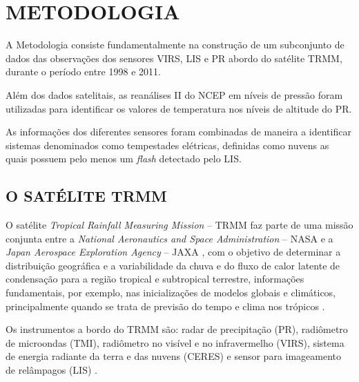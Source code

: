 \chapter{METODOLOGIA}
\label{metodologia}

A Metodologia consiste fundamentalmente na construção de um subconjunto de dados das observações dos sensores VIRS, LIS e PR abordo do satélite TRMM, durante o período entre 1998 e 2011. 

Além dos dados satelitais, as reanálises II do NCEP  em níveis de pressão foram utilizadas para identificar os valores de temperatura nos níveis de altitude do PR.

As informações dos diferentes sensores foram combinadas de maneira a identificar sistemas denominados como tempestades elétricas, definidas como nuvens as quais possuem pelo menos um \textit{flash} detectado pelo LIS. 


\section{O SATÉLITE TRMM}

O satélite \textit{Tropical Rainfall Measuring Mission} -- TRMM  faz parte de uma missão conjunta entre a \textit{National Aeronautics and Space Administration} -- NASA e  a \textit{Japan Aerospace Exploration Agency} -- JAXA , com o objetivo de determinar a distribuição geográfica e a variabilidade da chuva e do fluxo de calor latente de condensação para a região tropical e subtropical terrestre, informações fundamentais, por exemplo, nas inicializações de modelos globais e climáticos, principalmente quando se trata de previsão do tempo e clima nos trópicos \cite{kummerok1998,simpson1988}.
  
Os instrumentos a bordo do TRMM são: radar de precipitação (PR), radiômetro de microondas (TMI), radiômetro no visível e no infravermelho (VIRS), sistema de energia radiante da terra e das nuvens (CERES) e sensor para imageamento de relâmpagos (LIS) \cite{kummerok1998}.

